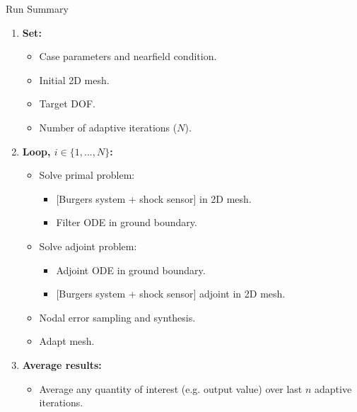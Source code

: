 \documentclass{beamer}
\newcounter{sectionframecount}
\begin{document}
\begin{frame}[t]{Run Summary}
  \vspace{-10pt}
  \begin{enumerate}
  \item \textbf{Set:}
    \begin{itemize}
      \item Case parameters and nearfield condition.
      \item Initial 2D mesh.
      \item Target DOF.
      \item Number of adaptive iterations ($N$).
    \end{itemize}

  \item \textbf{Loop, $i \in \{1,...,N\}$:}
  \begin{itemize}
    \item Solve primal problem:
    \begin{itemize}
      \item $[$Burgers system + shock sensor$]$ in 2D mesh.
      \item Filter ODE in ground boundary.
    \end{itemize}
    \item Solve adjoint problem:
    \begin{itemize}
      \item Adjoint ODE in ground boundary.
      \item $[$Burgers system + shock sensor$]$ adjoint in 2D mesh.
    \end{itemize}
    \item Nodal error sampling and synthesis.
    \item Adapt mesh.
  \end{itemize}

  \item \textbf{Average results:}
  \begin{itemize}
    \item Average any quantity of interest (e.g. output value) over last $n$ adaptive iterations.
  \end{itemize}
\end{enumerate}

\end{frame}

\end{document}
